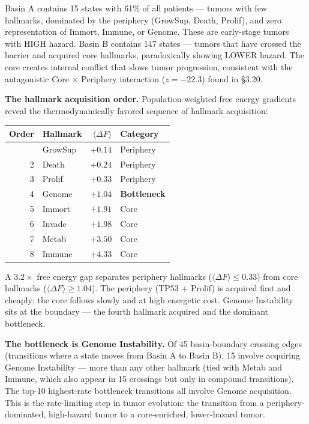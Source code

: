 \documentclass[
  11pt,
]{article}
\newcounter{none} %
\begin{document}
Basin A contains 15 states with 61\% of all patients --- tumors with few
hallmarks, dominated by the periphery (GrowSup, Death, Prolif), and zero
representation of Immort, Immune, or Genome. These are early-stage
tumors with HIGH hazard. Basin B contains 147 states --- tumors that
have crossed the barrier and acquired core hallmarks, paradoxically
showing LOWER hazard. The core creates internal conflict that slows
tumor progression, consistent with the antagonistic Core \(\times\)
Periphery interaction (\(z = -22.3\)) found in §3.20.

\textbf{The hallmark acquisition order.} Population-weighted free energy
gradients reveal the thermodynamically favored sequence of hallmark
acquisition:

{\def\LTcaptype{none} %
\begin{longtable}[]{@{}rlrl@{}}
\toprule\noalign{}
Order & Hallmark & \(\langle \Delta F \rangle\) & Category \\
\midrule\noalign{}
\endhead
\bottomrule\noalign{}
\endlastfoot
1 & GrowSup & \(+0.14\) & Periphery \\
2 & Death & \(+0.24\) & Periphery \\
3 & Prolif & \(+0.33\) & Periphery \\
4 & Genome & \(+1.04\) & \textbf{Bottleneck} \\
5 & Immort & \(+1.91\) & Core \\
6 & Invade & \(+1.98\) & Core \\
7 & Metab & \(+3.50\) & Core \\
8 & Immune & \(+4.33\) & Core \\
\end{longtable}
}

A \(3.2\times\) free energy gap separates periphery hallmarks
(\(\langle \Delta F \rangle \leq 0.33\)) from core hallmarks
(\(\langle \Delta F \rangle \geq 1.04\)). The periphery (TP53 + Prolif)
is acquired first and cheaply; the core follows slowly and at high
energetic cost. Genome Instability sits at the boundary --- the fourth
hallmark acquired and the dominant bottleneck.

\textbf{The bottleneck is Genome Instability.} Of 45 basin-boundary
crossing edges (transitions where a state moves from Basin A to Basin
B), 15 involve acquiring Genome Instability --- more than any other
hallmark (tied with Metab and Immune, which also appear in 15 crossings
but only in compound transitions). The top-10 highest-rate bottleneck
transitions all involve Genome acquisition. This is the rate-limiting
step in tumor evolution: the transition from a periphery-dominated,
high-hazard tumor to a core-enriched, lower-hazard tumor.
\end{document}
